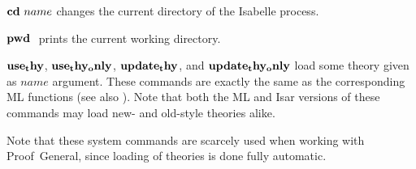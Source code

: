 \begin{descr}
\item [${\mathord{\mathbf{cd}}}~name$] changes the current directory of the Isabelle
  process.
\item [${\mathord{\mathbf{pwd}}}~$] prints the current working directory.
\item [${\mathord{\mathbf{use_thy}}}$, ${\mathord{\mathbf{use_thy_only}}}$,
  ${\mathord{\mathbf{update_thy}}}$, and ${\mathord{\mathbf{update_thy_only}}}$] load some
  theory given as $name$ argument.  These commands are exactly the same as the
  corresponding ML functions (see also \cite[\S1,\S6]{isabelle-ref}).  Note
  that both the ML and Isar versions of these commands may load new- and
  old-style theories alike.
\end{descr}

Note that these system commands are scarcely used when working with
Proof~General, since loading of theories is done fully automatic.


